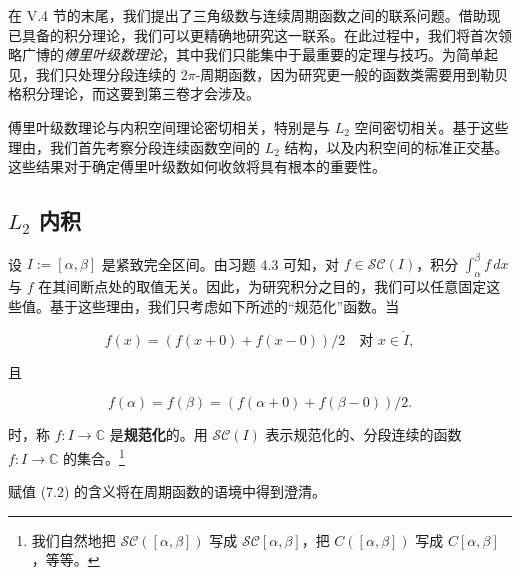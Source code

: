 在 V.4 节的末尾，我们提出了三角级数与连续周期函数之间的联系问题。借助现已具备的积分理论，我们可以更精确地研究这一联系。在此过程中，我们将首次领略广博的\emph{傅里叶级数理论}，其中我们只能集中于最重要的定理与技巧。为简单起见，我们只处理分段连续的 $ 2\pi $-周期函数，因为研究更一般的函数类需要用到勒贝格积分理论，而这要到第三卷才会涉及。

傅里叶级数理论与内积空间理论密切相关，特别是与 $ L_{2} $ 空间密切相关。基于这些理由，我们首先考察分段连续函数空间的 $ L_{2} $ 结构，以及内积空间的标准正交基。这些结果对于确定傅里叶级数如何收敛将具有根本的重要性。

\subsection*{$ L_{2} $ 内积}

设 $ I := [\alpha, \beta] $ 是紧致完全区间。由习题 4.3 可知，对 $ f \in \mathcal{SC}(I) $，积分 $ \int_{\alpha}^{\beta} f \, dx $ 与 $ f $ 在其间断点处的取值无关。因此，为研究积分之目的，我们可以任意固定这些值。基于这些理由，我们只考虑如下所述的“规范化”函数。当

\begin{equation}
f(x) = (f(x + 0) + f(x - 0))/2 \quad \text{对 } x \in \mathring{I} ,\tag{7.1}
\end{equation}

且

\begin{equation}
f(\alpha) = f(\beta) = (f(\alpha + 0) + f(\beta - 0))/2 .\tag{7.2}
\end{equation}

时，称 $ f : I \to \mathbb{C} $ 是\textbf{规范化}的。用 $ \mathcal{SC}(I) $ 表示规范化的、分段连续的函数 $ f : I \to \mathbb{C} $ 的集合。\footnote{我们自然地把 $ \mathcal{SC}([\alpha, \beta]) $ 写成 $ \mathcal{SC}[\alpha, \beta] $，把 $ C([\alpha, \beta]) $ 写成 $ C[\alpha, \beta] $，等等。}


赋值 (7.2) 的含义将在周期函数的语境中得到澄清。

